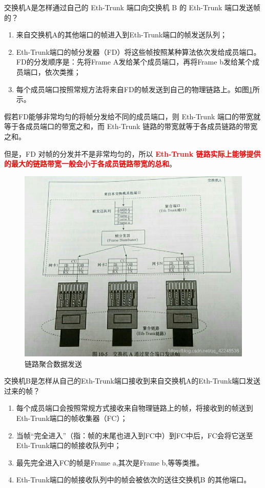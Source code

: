 交换机A是怎样通过自己的 Eth-Trunk 端口向交换机 B 的 Eth-Trunk 端口发送帧的？

\begin{enumerate}
    \item 来自交换机A的其他端口的帧进入到Eth-Trunk端口的帧发送队列；
    \item Eth-Trunk端口的帧分发器（FD）将这些帧按照某种算法依次发给成员端口。FD的分发顺序是：先将Frame A发给某个成员端口，再将Frame b发给某个成员端口，依次类推；
    \item 每个成员端口按照常规方法将来自FD的帧发送到自己的物理链路上。如图\ref{fig:switch_link_aggre_transmit}所示。
\end{enumerate}

假若FD能够非常均匀的将帧分发给不同的成员端口，则 Eth-Trunk 端口的带宽就等于各成员端口的带宽之和，而 Eth-Trunk 链路的带宽就等于各成员链路的带宽之和。

但是，FD 对帧的分发并不是非常均匀的，所以 \textcolor{red}{\textbf{Eth-Trunk 链路实际上能够提供的最大的链路带宽一般会小于各成员链路带宽的总和}}。

\begin{figure}[ht]
    \centering
    \includegraphics[scale=0.5]{pic/20190414171718383.jpg}
    \caption{链路聚合数据发送}
    \label{fig:switch_link_aggre_transmit}
\end{figure}

交换机B是怎样从自己的Eth-Trunk端口接收到来自交换机A的Eth-Trunk端口发送过来的帧？

\begin{enumerate}
    \item 每个成员端口会按照常规方式接收来自物理链路上的帧，将接收到的帧送到Eth-Trunk端口的帧收集器（FC）；
    \item 当帧“完全进入”（指：帧的末尾也进入到FC中）到FC中后，FC会将它送至Eth-Trunk端口的帧接收队列中；
    \item 最先完全进入FC的帧是Frame a,其次是Frame b,等等类推。
    \item Eth-Trunk端口的帧接收队列中的帧会被依次的送往交换机B 的其他端口。
\end{enumerate}


